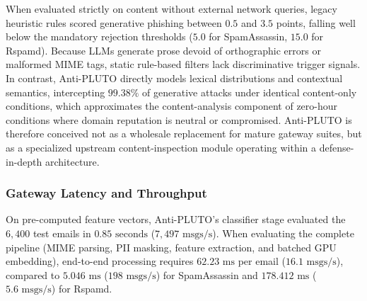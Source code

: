 \documentclass[journal]{IEEEtran}
\begin{document}
When evaluated strictly on content without external network queries, legacy heuristic rules scored generative phishing between $0.5$ and $3.5$ points, falling well below the mandatory rejection thresholds ($5.0$ for SpamAssassin, $15.0$ for Rspamd). Because LLMs generate prose devoid of orthographic errors or malformed MIME tags, static rule-based filters lack discriminative trigger signals. In contrast, Anti-PLUTO directly models lexical distributions and contextual semantics, intercepting $99.38\%$ of generative attacks under identical content-only conditions, which approximates the content-analysis component of zero-hour conditions where domain reputation is neutral or compromised. Anti-PLUTO is therefore conceived not as a wholesale replacement for mature gateway suites, but as a specialized upstream content-inspection module operating within a defense-in-depth architecture.

\subsubsection{Gateway Latency and Throughput}
On pre-computed feature vectors, Anti-PLUTO's classifier stage evaluated the $6,400$ test emails in $0.85\text{ seconds}$ ($7{,}497\text{ msgs/s}$). When evaluating the complete pipeline (MIME parsing, PII masking, feature extraction, and batched GPU embedding), end-to-end processing requires $62.23\text{ ms}$ per email ($16.1\text{ msgs/s}$), compared to $5.046\text{ ms}$ ($198\text{ msgs/s}$) for SpamAssassin and $178.412\text{ ms}$ ($5.6\text{ msgs/s}$) for Rspamd.
\end{document}
